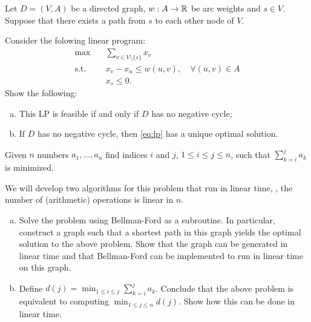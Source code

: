 \documentclass[11pt]{article}
\begin{document}
\problem
Let $D=(V,A)$ be a directed graph, $w:A \rightarrow \mathbb{R}$ be arc weights and $s \in V$. Suppose that there exists a path from $s$ to each other node of $V$.

Consider the folowing linear program:
\begin{equation}
\label{eq:lp}
\begin{split}
	\max \quad & \sum_{v \in V \setminus \{s\}} x_v \\
	\text{s.t.} \quad &   x_v - x_u \leq w(u,v), \quad \forall (u, v) \in A  \\
	\    &  x_s \leq 0. 
\end{split}
\end{equation} 
Show the following:
\begin{enumerate}[a)]
	\item
		This LP is feasible if and only if $D$ has no negative cycle;
	\item
	    If $D$ has no negative cycle, then \eqref{eq:lp} has a unique optimal solution. 
\end{enumerate}

\problem
Given $n$ numbers $a_1,\dots,a_n$ find indices $i$ and $j$, $1\le i \le j \le n$,
such that $\sum_{k=i}^{j} a_k$ is minimized.

We will develop two algorithms for this problem that run in linear time, \ie, the
number of (arithmetic) operations is linear in $n$.
\begin{enumerate}[(a)]
	\item Solve the problem using Bellman-Ford as a subroutine. In particular, construct a graph
		such that a shortest path in this graph yields the optimal solution to the above problem.
		Show that the graph can be generated in linear time and that Bellman-Ford can be implemented to run
		in linear time on this graph.
	\item Define $d(j)=\min_{1\le i\le j} \sum_{k=i}^j a_k$. Conclude that the above problem
		is equivalent to computing $\min_{1\le j\le n} d(j)$. Show how this can be done in linear time.
\end{enumerate}
\end{document}
